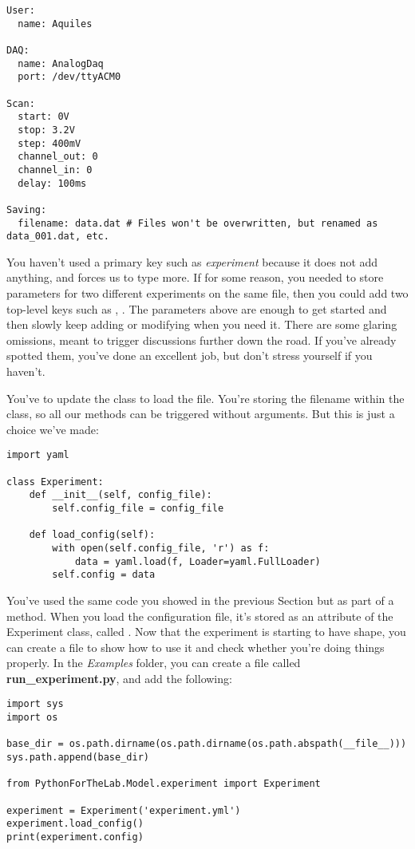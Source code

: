 \begin{verbatim}
User:
  name: Aquiles

DAQ:
  name: AnalogDaq
  port: /dev/ttyACM0

Scan:
  start: 0V
  stop: 3.2V
  step: 400mV
  channel_out: 0
  channel_in: 0
  delay: 100ms

Saving:
  filename: data.dat # Files won't be overwritten, but renamed as data_001.dat, etc.
\end{verbatim}

You haven't used a primary key such as \emph{experiment} because it does not add anything, and forces us to type more. If for some reason, you needed to store parameters for two different experiments on the same file, then you could add two top-level keys such as , . The parameters above are enough to get started and then slowly keep adding or modifying when you need it. There are some glaring omissions, meant to trigger discussions further down the road. If you've already spotted them, you've done an excellent job, but don't stress yourself if you haven't.

You've to update the  class to load the file. You're storing the filename within the class, so all our methods can be triggered without arguments. But this is just a choice we've made:

\begin{verbatim}
import yaml

class Experiment:
    def __init__(self, config_file):
        self.config_file = config_file

    def load_config(self):
        with open(self.config_file, 'r') as f:
            data = yaml.load(f, Loader=yaml.FullLoader)
        self.config = data
\end{verbatim}

You've used the same code you showed in the previous Section but as part of a method. When you load the configuration file, it's stored as an attribute of the Experiment class, called . Now that the experiment is starting to have shape, you can create a file to show how to use it and check whether you're doing things properly. In the \emph{Examples} folder, you can create a file called \textbf{run\_experiment.py}, and add the following:

\begin{verbatim}
import sys
import os

base_dir = os.path.dirname(os.path.dirname(os.path.abspath(__file__)))
sys.path.append(base_dir)

from PythonForTheLab.Model.experiment import Experiment

experiment = Experiment('experiment.yml')
experiment.load_config()
print(experiment.config)
\end{verbatim}

